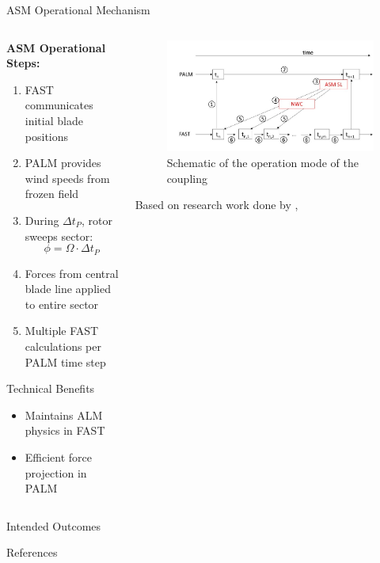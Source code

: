 \documentclass[aspectratio=1610]{beamer}
\begin{document}
\begin{frame}{ASM Operational Mechanism}
    \begin{columns}
        \begin{column}{0.6\textwidth}
            \textbf{ASM Operational Steps:}
            \begin{enumerate}
                \item FAST communicates initial blade positions
                \item PALM provides wind speeds from frozen field
                \item During $\Delta t_P$, rotor sweeps sector: 
                $$\phi = \Omega \cdot \Delta t_P$$
                \item Forces from central blade line applied to entire sector
                \item Multiple FAST calculations per PALM time step
            \end{enumerate}
            
            \vspace{0.3cm}
            \begin{block}{Technical Benefits}
                \begin{itemize}
                    \item Maintains ALM physics in FAST
                    \item Efficient force projection in PALM
                \end{itemize}
            \end{block}
        \end{column}
        
        \begin{column}{0.4\textwidth}
            \begin{figure}
                \includegraphics[width=\textwidth]{ASM.jpg}
                \caption{Schematic of the operation mode of the coupling}
                \label{fig:asm_sector}
            \end{figure}
            Based on research work done by \cite{steinbruck2024}, \cite{kruger2022}
        \end{column}
    \end{columns}
\end{frame}

\begin{frame}{Intended Outcomes}

\end{frame}
\begin{frame}{References}
    \printbibliography
\end{frame}
\end{document}
